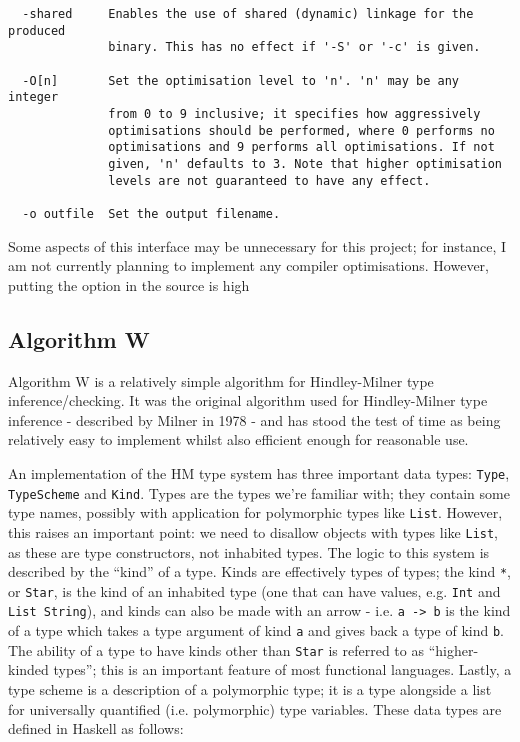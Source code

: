\documentclass[9pt]{extarticle}
\begin{document}
\begin{verbatim}
  -shared     Enables the use of shared (dynamic) linkage for the produced
              binary. This has no effect if '-S' or '-c' is given.

  -O[n]       Set the optimisation level to 'n'. 'n' may be any integer
              from 0 to 9 inclusive; it specifies how aggressively
              optimisations should be performed, where 0 performs no
              optimisations and 9 performs all optimisations. If not
              given, 'n' defaults to 3. Note that higher optimisation
              levels are not guaranteed to have any effect.

  -o outfile  Set the output filename.

\end{verbatim}

Some aspects of this interface may be unnecessary for this project; for
instance, I am not currently planning to implement any compiler
optimisations. However, putting the option in the source is high

\subsection{Algorithm W}

Algorithm W is a relatively simple algorithm for Hindley-Milner type
inference/checking. It was the original algorithm used for
Hindley-Milner type inference - described by Milner in 1978 - and has
stood the test of time as being relatively easy to implement whilst also
efficient enough for reasonable use.

An implementation of the HM type system has three important data types:
\verb'Type', \verb'TypeScheme' and \verb'Kind'. Types are the types
we're familiar with; they contain some type names, possibly with
application for polymorphic types like \verb'List'. However, this raises
an important point: we need to disallow objects with types like
\verb'List', as these are type constructors, not inhabited types. The
logic to this system is described by the ``kind'' of a type. Kinds are
effectively types of types; the kind \verb'*', or \verb'Star', is the
kind of an inhabited type (one that can have values, e.g. \verb'Int' and
\verb'List String'), and kinds can also be made with an arrow - i.e.
\verb'a -> b' is the kind of a type which takes a type argument of kind
\verb'a' and gives back a type of kind \verb'b'. The ability of a type
to have kinds other than \verb'Star' is referred to as ``higher-kinded
types''; this is an important feature of most functional languages.
Lastly, a type scheme is a description of a polymorphic type; it is a
type alongside a list for universally quantified (i.e. polymorphic) type
variables. These data types are defined in Haskell as follows:
\end{document}

